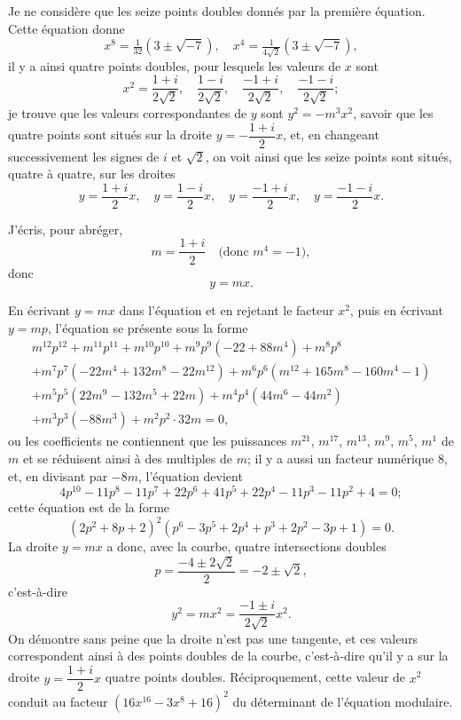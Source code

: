 \documentclass[11pt,a4paper]{book}
\begin{document}
Je ne consid\`ere que les seize points doubles donn\'es par la premi\`ere \'equation. Cette \'equation donne
\[
x^8 = \tfrac{1}{32}(3 \pm \sqrt{-7}),\quad x^4 = \tfrac{1}{4\sqrt{2}}(3 \pm \sqrt{-7}),
\]
il y a ainsi quatre points doubles, pour lesquels les valeurs de $x$ sont
\[
x^2 = \frac{1 + i}{2\sqrt{2}},\quad \frac{1 - i}{2\sqrt{2}},\quad \frac{-1 + i}{2\sqrt{2}},\quad \frac{-1 - i}{2\sqrt{2}};
\]
je trouve que les valeurs correspondantes de $y$ sont $y^2 = -m^3x^2$, savoir que les quatre points sont situ\'es sur la droite $y = -\dfrac{1+i}{2}x$, et, en changeant successivement les signes de $i$ et $\sqrt{2}$, on voit ainsi que les seize points sont situ\'es, quatre \`a quatre, sur les droites
\[
y = \frac{1+i}{2}x,\quad y = \frac{1-i}{2}x,\quad y = \frac{-1+i}{2}x,\quad y = \frac{-1-i}{2}x.
\]

J'\'ecris, pour abr\'eger,
\[
m = \frac{1+i}{2}\quad \text{(donc } m^4 = -1\text{)},
\]
donc
\[
y = mx.
\]

En \'ecrivant $y = mx$ dans l'\'equation et en rejetant le facteur $x^2$, puis en \'ecrivant $y = mp$, l'\'equation se pr\'esente sous la forme
\begin{multline*}
m^{12}p^{12} + m^{11}p^{11} + m^{10}p^{10} + m^9p^9(-22 + 88m^4) + m^8p^8 \\
+ m^7p^7(-22m^4 + 132m^8 - 22m^{12}) + m^6p^6(m^{12} + 165m^8 - 160m^4 - 1) \\
+ m^5p^5(22m^9 - 132m^5 + 22m) + m^4p^4(44m^6 - 44m^2) \\
+ m^3p^3(-88m^3) + m^2p^2 \cdot 32m = 0,
\end{multline*}
ou les coefficients ne contiennent que les puissances $m^{21}$, $m^{17}$, $m^{13}$, $m^9$, $m^5$, $m^1$ de $m$ et se r\'eduisent ainsi \`a des multiples de $m$; il y a aussi un facteur num\'erique 8, et, en divisant par $-8m$, l'\'equation devient
\[
4p^{10} - 11p^8 - 11p^7 + 22p^6 + 41p^5 + 22p^4 - 11p^3 - 11p^2 + 4 = 0;
\]
cette \'equation est de la forme
\[
(2p^2 + 8p + 2)^2(p^6 - 3p^5 + 2p^4 + p^3 + 2p^2 - 3p + 1) = 0.
\]
La droite $y = mx$ a donc, avec la courbe, quatre intersections doubles
\[
p = \frac{-4 \pm 2\sqrt{2}}{2} = -2 \pm \sqrt{2},
\]
c'est-\`a-dire
\[
y^2 = mx^2 = \frac{-1 \pm i}{2\sqrt{2}}x^2.
\]
On d\'emontre sans peine que la droite n'est pas une tangente, et ces valeurs correspondent ainsi \`a des points doubles de la courbe, c'est-\`a-dire qu'il y a sur la droite $y = \dfrac{1+i}{2}x$ quatre points doubles. R\'eciproquement, cette valeur de $x^2$ conduit au facteur $(16x^{16} - 3x^8 + 16)^2$ du d\'eterminant de l'\'equation modulaire.
\end{document}
